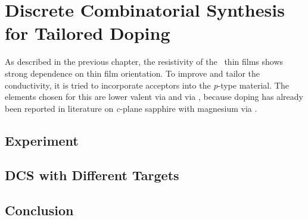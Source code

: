\section{Discrete Combinatorial Synthesis for Tailored Doping}
    \label{Sec:Results_Doping}
As described in the previous chapter, the resistivity of the \cro\ thin films shows strong dependence on thin film orientation.
To improve and tailor the conductivity, it is tried to incorporate acceptors into the \textit{p}-type material.
The elements chosen for this are lower valent  via  and  via , because doping has already been reported in literature on \textit{c}-plane sapphire with magnesium via 
    \cite{farrell2015}.

\subsection{Experiment}
    
\subsection{DCS with Different Targets}
    
\subsection{Conclusion}
    